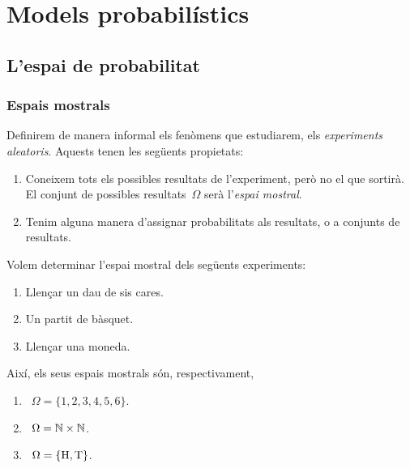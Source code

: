\documentclass[../probabilitat.tex]{subfiles}
\begin{document}
\chapter{Models probabilístics}
\section{L'espai de probabilitat}
\subsection{Espais mostrals}
    \begin{definition}
        \label{def:experiment-aleatori}
        \label{def:espai-mostral}
        Definirem de manera informal els fenòmens que estudiarem, els \emph{experiments aleatoris}.
        Aquests tenen les següents propietats:
        \begin{enumerate}
            \item Coneixem tots els possibles resultats de l'experiment, però no el que sortirà.
            El conjunt de possibles resultats~\(\Omega\) serà l'\emph{espai mostral}.
            \item Tenim alguna manera d'assignar probabilitats als resultats, o a conjunts de resultats.
        \end{enumerate}
    \end{definition}
    \begin{example}
        \label{ex:espais-mostrals}
        Volem determinar l'espai mostral dels següents experiments:
        \begin{enumerate}
            \item\label{ex:espais-mostrals:eq1} Llençar un dau de sis cares.
            \item\label{ex:espais-mostrals:eq2} Un partit de bàsquet.
            \item\label{ex:espais-mostrals:eq3} Llençar una moneda.
        \end{enumerate}
    \end{example}
    \begin{solution}
        Així, els seus espais mostrals són, respectivament,
        \begin{enumerate}
            \item~\(\Omega=\{1,2,3,4,5,6\}\).
            \item~\(\Omega=\mathbb{N}\times\mathbb{N}\).
            \item~\(\Omega=\{\mathrm{H},\mathrm{T}\}\).\qedhere
        \end{enumerate}
    \end{solution}
\end{document}

